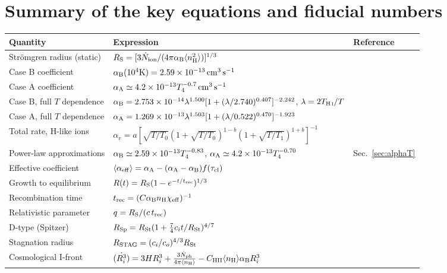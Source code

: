 \documentclass[11pt,a4paper]{article}
\newcommand{\Ndot}{\dot{N}_{\rm ion}}
\newcommand{\aB}{\alpha_{\rm B}}
\newcommand{\aA}{\alpha_{\rm A}}
\newcommand{\nH}{n_{\rm H}}
\newcommand{\cms}{\,{\rm cm^{3}\,s^{-1}}}
\begin{document}
\section{Summary of the key equations and fiducial numbers}

\begin{table}[h]
\centering
\small
\begin{tabular}{@{}p{5.6cm}p{6.4cm}p{3.2cm}@{}}
\toprule
Quantity & Expression & Reference \\
\midrule
Str\"omgren radius (static) & $R_{\rm S}=[3\Ndot/(4\pi\aB\langle n_{\rm H}^2\rangle)]^{1/3}$ & \citet{Cen2000} \\
Case B coefficient & $\aB(10^4{\rm K})=2.59\times10^{-13}\cms$ & \citet{Shapiro2006} \\
Case A coefficient & $\aA\simeq4.2\times10^{-13}T_4^{-0.7}\cms$ & \citet{Gnedin2022} \\
Case B, full $T$ dependence & $\aB=2.753\times10^{-14}\lambda^{1.500}[1+(\lambda/2.740)^{0.407}]^{-2.242}$, $\lambda=2T_{\rm H\,\textsc{i}}/T$ & \citet{Hui1997} \\
Case A, full $T$ dependence & $\aA=1.269\times10^{-13}\lambda^{1.503}[1+(\lambda/0.522)^{0.470}]^{-1.923}$ & \citet{Hui1997} \\
Total rate, H-like ions & $\alpha_r=a[\sqrt{T/T_0}(1+\sqrt{T/T_0})^{1-b}(1+\sqrt{T/T_1})^{1+b}]^{-1}$ & \citet{Verner1996} \\
Power-law approximations & $\aB\simeq2.59\times10^{-13}T_4^{-0.83}$, $\aA\simeq4.2\times10^{-13}T_4^{-0.70}$ & Sec.~\ref{sec:alphaT} \\
Effective coefficient & $\langle\alpha_{\rm eff}\rangle=\aA-(\aA-\aB)f(\tau_{\rm cl})$ & \citet{Nebrin2023} \\
Growth to equilibrium & $R(t)=R_{\rm S}(1-e^{-t/t_{\rm rec}})^{1/3}$ & \citet{Shapiro2006} \\
Recombination time & $t_{\rm rec}=(C\aB \nH\chi_{\rm eff})^{-1}$ & \citet{Shapiro2006} \\
Relativistic parameter & $q=R_{\rm S}/(c\,t_{\rm rec})$ & \citet{Shapiro2006} \\
D-type (Spitzer) & $R_{\rm Sp}=R_{\rm St}(1+\tfrac{7}{4}c_it/R_{\rm St})^{4/7}$ & \citet{Bisbas2015} \\
Stagnation radius & $R_{\rm STAG}=(c_i/c_o)^{4/3}R_{\rm St}$ & \citet{Bisbas2015} \\
Cosmological I-front & $\dot{(R_i^3)}=3HR_i^3+\tfrac{3\dot N_{\rm ph}}{4\pi\langle \nH\rangle}-C_{\rm HII}\langle \nH\rangle\aB R_i^3$ & \citet{Cen2000,ShapiroGiroux1987} \\

\end{tabular}
\end{table}
\end{document}

